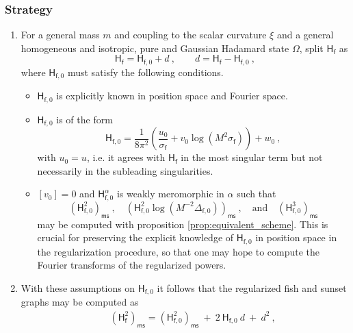 \documentclass[12pt]{book}
\newcommand{\ms}{\mathsf{ms}}
\newcommand{\Hsf}{\mathsf{H}}
\newcommand{\fsf}{\mathsf{f}}
\theoremstyle{break}
\begin{document}
\subsubsection{Strategy}


\begin{enumerate}
%
%
\item For a general mass $m$ and coupling to the scalar curvature $\xi$ and a general homogeneous and isotropic, pure and Gaussian Hadamard state $\Omega$, split $\Hsf_\fsf$ as
%
\begin{equation}
\Hsf_\fsf = \Hsf_{\fsf,0} + d \ , \qquad d = \Hsf_\fsf - \Hsf_{\fsf,0} \ ,
\label{eq:propagator_split}
\end{equation}
%
where $\Hsf_{\fsf,0}$ must satisfy the following conditions.
%
\begin{itemize}
%
\item $\Hsf_{\fsf,0}$ is explicitly known in position space and Fourier space.
%
\item $\Hsf_{\fsf,0}$ is of the form
%
\begin{equation*}
\Hsf_{\fsf,0} = \frac{1}{8\pi^2} \left( \frac{u_0}{\sigma_\fsf} + v_0 \log\left(M^2\sigma_\fsf\right) \right) + w_0 \ , 
\end{equation*}
%
with $u_0=u$, i.e. it agrees with $\Hsf_\fsf$ in the most singular term but not necessarily in the subleading singularities.
%
\item $[v_0]=0$ and $\Hsf^{\alpha}_{\fsf,0}$ is weakly meromorphic in $\alpha$ such that
%
\begin{equation*}
\left(\Hsf^2_{\fsf,0}\right)_\ms \ , \quad 
\left(\Hsf^2_{\fsf,0} \log\left(M^{-2} \Delta_{\fsf,0}\right) \right)_\ms \ , \quad
\mbox{and} \quad \left(\Hsf^3_{\fsf,0}\right)_\ms 
\end{equation*}
%
may be computed with proposition \ref{prop:equivalent_scheme}. This is crucial for preserving the explicit knowledge of $\Hsf_{\fsf,0}$ in position space in the regularization procedure, so that one may hope to compute the Fourier transforms of the regularized powers.
%
\end{itemize}
%
%
\item With these assumptions on $\Hsf_{\fsf,0}$ it follows that the regularized fish and sunset graphs may be computed as
%
\begin{eqnarray}
&& (\Hsf_\fsf^2)_\ms = (\Hsf_{\fsf,0}^2)_\ms \ + \ 2 \ \Hsf_{\fsf,0} \ d \ + \ d^2 \ , \nonumber \\

\end{eqnarray}
\end{enumerate}
\end{document}

